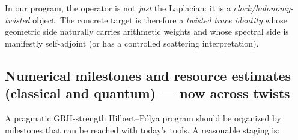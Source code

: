 \documentclass[11pt,oneside]{amsbook}
\numberwithin{equation}{section}
\theoremstyle{plain}
\theoremstyle{definition}
\theoremstyle{remark}
\begin{document}
In our program, the operator is not \emph{just} the Laplacian: it is a \emph{clock/holonomy-twisted} object.
The concrete target is therefore a \emph{twisted trace identity} whose geometric side naturally carries arithmetic weights and whose spectral side is manifestly self-adjoint (or has a controlled scattering interpretation).

\subsection{Numerical milestones and resource estimates (classical and quantum) --- now across twists}
\label{sec:hp_milestones}

A pragmatic GRH-strength Hilbert--Pólya program should be organized by milestones that can be reached with today's tools.
A reasonable staging is:
\end{document}
